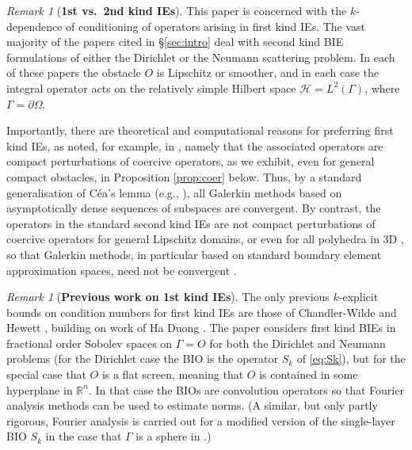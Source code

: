 \documentclass{birkjour}
\theoremstyle{definition}
\theoremstyle{remark}
\newtheorem{remark}[theorem]{Remark}
\numberwithin{equation}{section}
\newcommand{\R}{\mathbb{R}}
\newcommand{\cH}{\mathcal{H}}
\begin{document}
\begin{remark}[\bf 1st vs.~2nd kind IEs]
This paper is concerned with the $k$-dependence of conditioning of operators arising in first kind IEs. The vast majority of the papers cited in \S\ref{sec:intro} deal with second kind BIE formulations of either the Dirichlet \cite{KrSp83,Kr85,Am90,ChHe:06,BaSa2007,DomGra07,CWMonk2008,ChGrLaLi:09,SpeCha11,BetCha11,chandler2012numerical,Me:12,spence2014wavenumber,HaTa:15,SpKaSm:15,baskin2016sharp,GaSp2019,chandler2020high,lafontaine2021most} or the Neumann \cite{BoTu2013,GaMaSpe2022}  scattering problem. In each of these papers the obstacle $O$ is Lipschitz or smoother, and in each case the integral operator acts on the relatively simple Hilbert space $\cH = L^2(\Gamma)$, where $\Gamma=\partial \Omega$.

Importantly, there are theoretical and computational reasons for preferring first kind IEs, as noted, for example, in \cite{BufSau07}, namely that the associated operators are compact perturbations of coercive operators, as we exhibit, even for general compact obstacles, in Proposition \ref{prop:coer} below.
Thus, by a standard generalisation of C\'ea's lemma (e.g., \cite[Thm.~2.3]{CWSpence22}), all Galerkin methods based on asymptotically dense sequences of subspaces are convergent. By contrast, the operators in the standard second kind IEs are not compact perturbations of coercive operators for general Lipschitz domains, or even for all polyhedra in 3D \cite{CWSpence22}, so that Galerkin methods, in particular based on standard boundary element approximation spaces, need not be convergent \cite[Thm.~1.4]{CWSpence22}.
\end{remark}

\begin{remark}[\bf Previous work on 1st kind IEs]
The only previous $k$-explicit bounds on condition numbers  for first kind IEs are those of Chandler-Wilde and Hewett \cite{CWHewett2015}, building on work of Ha Duong \cite{Ha-Du:90,Ha-Du:92}.
The paper \cite{CWHewett2015} considers first kind BIEs in fractional order Sobolev spaces on $\Gamma=O$ for both the Dirichlet and Neumann problems (for the Dirichlet case the BIO is the operator $S_k$ of \eqref{eq:Sk}),  but for the special case that $O$ is a flat screen, meaning that $O$ is contained in some hyperplane in $\R^n$. In that case the BIOs are convolution operators so that Fourier analysis methods can be used to estimate norms.  (A similar, but only partly rigorous, Fourier analysis is carried out for a modified version of the single-layer BIO $S_k$ in the case that $\Gamma$ is a sphere in \cite{BufSau07}.)
\end{remark}
\end{document}
